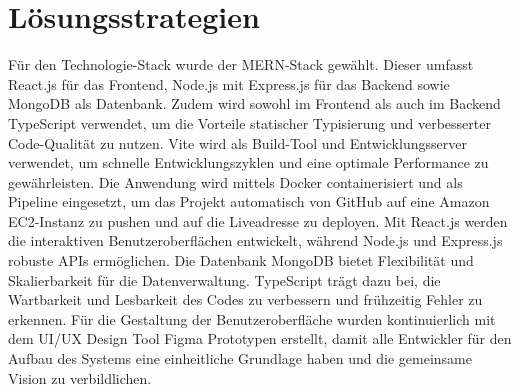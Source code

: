 \documentclass[conference,a4paper,flushend]{cs-techrep}
\begin{document}
\section{Lösungsstrategien}
Für den Technologie-Stack wurde der MERN-Stack gewählt. Dieser umfasst React.js\cite{React.js} für das Frontend, Node.js\cite{Node.js} mit Express.js\cite{Express} für das Backend sowie MongoDB\cite{MongoDB} als Datenbank. Zudem wird sowohl im Frontend als auch im Backend TypeScript\cite{TypeScript} verwendet, um die Vorteile statischer Typisierung und verbesserter Code-Qualität zu nutzen. Vite\cite{Vite} wird als Build-Tool und Entwicklungsserver verwendet, um schnelle Entwicklungszyklen und eine optimale Performance zu gewährleisten. Die Anwendung wird mittels Docker\cite{Docker} containerisiert und als Pipeline eingesetzt, um das Projekt automatisch von GitHub auf eine Amazon EC2-Instanz zu pushen und auf die Liveadresse zu deployen. Mit React.js werden die interaktiven Benutzeroberflächen entwickelt, während Node.js und Express.js robuste APIs ermöglichen. Die Datenbank MongoDB bietet Flexibilität und Skalierbarkeit für die Datenverwaltung. TypeScript trägt dazu bei, die Wartbarkeit und Lesbarkeit des Codes zu verbessern und frühzeitig Fehler zu erkennen. Für die Gestaltung der Benutzeroberfläche wurden kontinuierlich mit dem UI/UX Design Tool Figma Prototypen erstellt, damit alle Entwickler für den Aufbau des Systems eine einheitliche Grundlage haben und die gemeinsame Vision zu verbildlichen.
\end{document}
